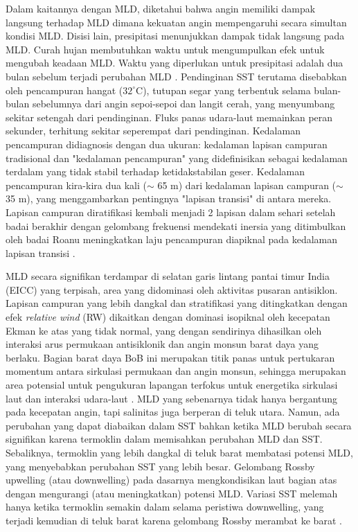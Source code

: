 \begin{spacing}{1.5}
	Dalam kaitannya dengan MLD, diketahui bahwa angin memiliki dampak langsung terhadap MLD dimana kekuatan angin mempengaruhi secara simultan kondisi MLD. Disisi lain, presipitasi menunjukkan dampak tidak langsung pada MLD. Curah hujan membutuhkan waktu untuk mengumpulkan efek untuk mengubah keadaan MLD. Waktu yang diperlukan untuk presipitasi adalah dua bulan sebelum terjadi perubahan MLD . Pendinginan SST terutama disebabkan oleh pencampuran hangat ($32^\circ$C), tutupan segar yang terbentuk selama bulan-bulan sebelumnya dari angin sepoi-sepoi dan langit cerah, yang menyumbang sekitar setengah dari pendinginan. Fluks panas udara-laut memainkan peran sekunder, terhitung sekitar seperempat dari pendinginan. Kedalaman pencampuran didiagnosis dengan dua ukuran: kedalaman lapisan campuran tradisional dan "kedalaman pencampuran" yang didefinisikan sebagai kedalaman terdalam yang tidak stabil terhadap ketidakstabilan geser. Kedalaman pencampuran kira-kira dua kali ($\sim$ 65 m) dari kedalaman lapisan campuran ($\sim$ 35 m), yang menggambarkan pentingnya "lapisan transisi" di antara mereka. Lapisan campuran diratifikasi kembali menjadi 2 lapisan dalam sehari setelah badai berakhir dengan gelombang frekuensi mendekati inersia yang ditimbulkan oleh badai Roanu meningkatkan laju pencampuran diapiknal pada kedalaman lapisan transisi . 
	
	MLD secara signifikan terdampar di selatan garis lintang pantai timur India (EICC) yang terpisah, area yang didominasi oleh aktivitas pusaran antisiklon. Lapisan campuran yang lebih dangkal dan stratifikasi yang ditingkatkan dengan efek \textit{relative wind} (RW) dikaitkan dengan dominasi isopiknal oleh kecepatan Ekman ke atas yang tidak normal, yang dengan sendirinya dihasilkan oleh interaksi arus permukaan antisiklonik dan angin monsun barat daya yang berlaku. Bagian barat daya BoB ini merupakan titik panas untuk pertukaran momentum antara sirkulasi permukaan dan angin monsun, sehingga merupakan area potensial untuk pengukuran lapangan terfokus untuk energetika sirkulasi laut dan interaksi udara-laut . MLD yang sebenarnya tidak hanya bergantung pada kecepatan angin, tapi salinitas juga berperan di teluk utara. Namun, ada perubahan yang dapat diabaikan dalam SST bahkan ketika MLD berubah secara signifikan karena termoklin dalam memisahkan perubahan MLD dan SST. Sebaliknya, termoklin yang lebih dangkal di teluk barat membatasi potensi MLD, yang menyebabkan perubahan SST yang lebih besar. Gelombang Rossby upwelling (atau downwelling) pada dasarnya mengkondisikan laut bagian atas dengan mengurangi (atau meningkatkan) potensi MLD. Variasi SST melemah hanya ketika termoklin semakin dalam selama peristiwa downwelling, yang terjadi kemudian di teluk barat karena gelombang Rossby merambat ke barat . 
	

\end{spacing}

